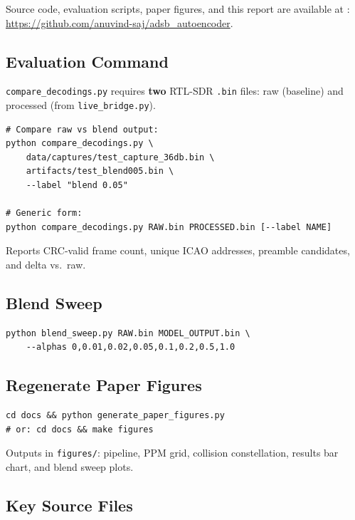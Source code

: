 \documentclass[11pt,a4paper]{article}
\begin{document}
Source code, evaluation scripts, paper figures, and this report are available
at \cite{adsb_repo}:
\url{https://github.com/anuvind-saj/adsb_autoencoder}.

\subsection{Evaluation Command}

\texttt{compare\_decodings.py} requires \textbf{two} RTL-SDR \texttt{.bin} files:
raw (baseline) and processed (from \texttt{live\_bridge.py}).

\begin{lstlisting}[style=cli]
# Compare raw vs blend output:
python compare_decodings.py \
    data/captures/test_capture_36db.bin \
    artifacts/test_blend005.bin \
    --label "blend 0.05"

# Generic form:
python compare_decodings.py RAW.bin PROCESSED.bin [--label NAME]
\end{lstlisting}

Reports CRC-valid frame count, unique ICAO addresses, preamble candidates,
and delta vs.\ raw.

\subsection{Blend Sweep}

\begin{lstlisting}[style=cli]
python blend_sweep.py RAW.bin MODEL_OUTPUT.bin \
    --alphas 0,0.01,0.02,0.05,0.1,0.2,0.5,1.0
\end{lstlisting}

\subsection{Regenerate Paper Figures}

\begin{lstlisting}[style=cli]
cd docs && python generate_paper_figures.py
# or: cd docs && make figures
\end{lstlisting}

Outputs in \texttt{figures/}: pipeline, PPM grid, collision constellation,
results bar chart, and blend sweep plots.

\subsection{Key Source Files}
\end{document}
